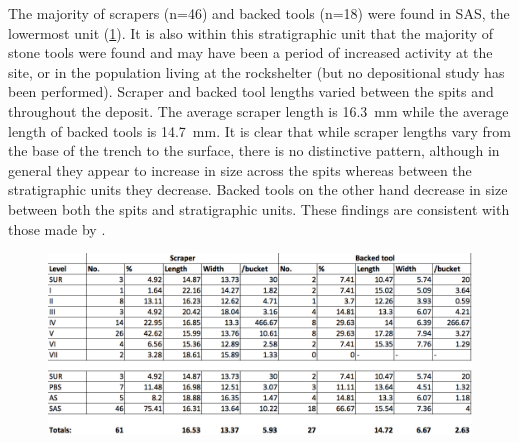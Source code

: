 \documentclass{ijsra}
\begin{document}
   The majority of scrapers (n=46) and backed tools (n=18) were found in SAS, the lowermost unit (\cref{fig:Forssman-Table04}). 
  It is also within this stratigraphic unit that the majority of stone tools were found and may have been a period of increased activity at the site, or in the population living at the rockshelter (but no depositional study has been performed). Scraper and backed tool lengths varied between the spits and throughout the deposit. The average scraper length is \SI{16.3}{\milli\meter} 
   while the average length of backed tools is \SI{14.7}{\milli\meter}. 
  It is clear that while scraper lengths vary from the base of the trench to the surface, there is no distinctive pattern, 
   although in general they appear to increase in size across the spits whereas between the stratigraphic units they decrease. Backed tools on the other hand decrease in size between both the spits and stratigraphic units. These findings are consistent with those made by \textcite[31]{Walker_1994}.
   
   	\begin{figure} %
   		\includegraphics[width=\linewidth]{figures/Forssman-Table04}
   		\centering
   		\label{fig:Forssman-Table04}
   	\end{figure}
   
\end{document}
